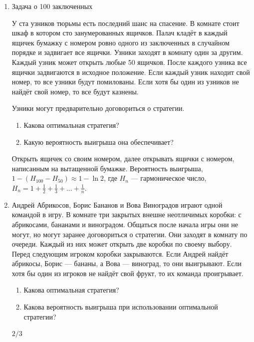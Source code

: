\documentclass[nobib]{tufte-handout}
\begin{document}
\begin{enumerate}
\item Задача о 100 заключенных 

У ста узников тюрьмы есть последний шанс на спасение. В комнате стоит шкаф в котором сто занумерованных ящичков. Палач кладёт в каждый ящичек бумажку с номером ровно одного из заключенных в случайном порядке и задвигает все ящички. Узники заходят в комнату один за другим. Каждый узник может открыть любые 50 ящичков. После каждого узника все ящички задвигаются в исходное положение. Если каждый узник находит свой номер, то все узники будут помилованы. Если хотя бы один из узников не найдёт свой номер, то все будут казнены. 

Узники могут предварительно договориться о стратегии.

\begin{enumerate}
\item Какова оптимальная стратегия?
\item Какую вероятность выигрыша она обеспечивает?
\end{enumerate}
  
\begin{solution}
Открыть ящичек со своим номером, далее открывать ящички с номером, написанным на вытащенной бумажке. Вероятность выигрыша, $1-(H_{100}-H_{50}) \approx 1- \ln 2$, где $H_n$ --- гармоническое число, $H_n=1+\frac{1}{2} + \frac{1}{3} + \ldots + \frac{1}{n}$.
\end{solution}
  
\item Андрей Абрикосов, Борис Бананов и Вова Виноградов играют одной командой в игру. В комнате три закрытых внешне неотличимых коробки: с абрикосами, бананами и виноградом. Общаться после начала игры они не могут, но могут заранее договориться о стратегии. Они заходят в комнату по очереди. Каждый из них может открыть две коробки по своему выбору. Перед следующим игроком коробки закрываются. Если Андрей найдёт абрикосы, Борис --- бананы, а Вова --- виноград, то они выигрывают. Если хотя бы один из игроков не найдёт свой фрукт, то их 
команда проигрывает.

\begin{enumerate}
\item Какова оптимальная стратегия?

\item Какова вероятность выигрыша при использовании оптимальной стратегии?
\end{enumerate}


\begin{solution}
$2/3$
\end{solution}


\end{enumerate}
\end{document}

